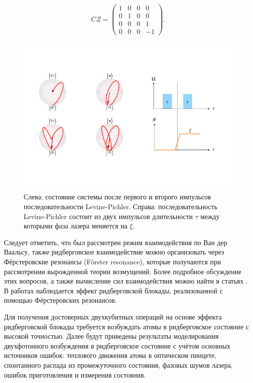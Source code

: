 \begin{equation}
	CZ = \begin{pmatrix}
		1 & 0 & 0 & 0\\
		0 & 1 & 0 & 0\\
		0 & 0 & 0 & 1\\
		0 & 0 & 0 & -1
	\end{pmatrix}.
\end{equation}

\begin{figure}[ht]
	\centering
	\includegraphics[width=1.0\textwidth]{images/LP_total.pdf}
	\caption{Слева: состояние системы после первого и второго импульсов последовательности Levine-Pichler. Справа: последовательность Levine-Pichler состоит из двух импульсов длительности $\tau$ между которыми фаза лазера меняется на $\xi$.}
	\label{fig:LP_total}
\end{figure}


Следует отметить, что был рассмотрен режим взаимодействия по Ван дер Ваальсу, также ридберговское взаимодействие можно организовать через Фёрстеровские резонансы (Förster resonance), которые получаются при рассмотрении вырожденной теории возмущений. Более подробное обсуждение этих вопросов, а также вычисление сил взаимодействия можно найти в статьях \cite{Saffman_Rydberg1, Saffman_Rydberg2,PhysRevLett.85.2208}. В работах \cite{Chew:2022aa,Urban:2009aa} наблюдается эффект ридберговской блокады, реализованной с помощью Фёрстеровских резонансов. 

Для получения достоверных двухкубитных операций на основе эффекта ридберговской блокады требуется возбуждать атомы в ридберговское состояние с высокой точностью. Далее будут приведены результаты моделирования двухфотонного возбуждения в ридберговское состояние с учётом основных источников ошибок: теплового движения атома в оптическом пинцете, спонтанного распада из промежуточного состояния, фазовых шумов лазера, ошибок приготовления и измерения состояния.

